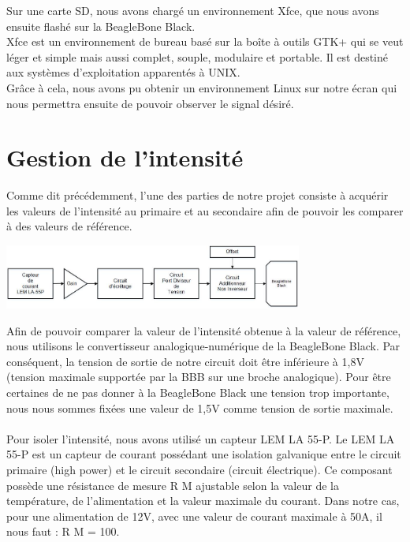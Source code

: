 \documentclass{report}
\begin{document}
Sur une carte SD, nous avons charg\'{e} un environnement Xfce, que nous avons ensuite flash\'{e}
sur la BeagleBone Black.\\
Xfce est un environnement de bureau bas\'{e} sur la boîte \`{a} outils GTK+ qui se veut l\'{e}ger et
simple mais aussi complet, souple, modulaire et portable. Il est destin\'{e} aux syst\`{e}mes
d'exploitation apparent\'{e}s \`{a} UNIX.\\
Gr\^{a}ce \`{a} cela, nous avons pu obtenir un environnement Linux sur notre \'{e}cran qui nous
permettra ensuite de pouvoir observer le signal d\'{e}sir\'{e}.

\section{Gestion de l'intensit\'{e}}

Comme dit pr\'{e}c\'{e}demment, l’une des parties de notre projet consiste \`{a} acqu\'{e}rir les valeurs
de l’intensit\'{e} au primaire et au secondaire afin de pouvoir les comparer \`{a} des valeurs de
r\'{e}f\'{e}rence.\\

\begin{center}
 \includegraphics[height=80]{./Schema/sch_bloc_amp.jpg}
\end{center}

Afin de pouvoir comparer la valeur de l’intensit\'{e} obtenue \`{a} la valeur de r\'{e}f\'{e}rence, nous
utilisons le convertisseur analogique-num\'{e}rique de la BeagleBone Black. Par cons\'{e}quent, la
tension de sortie de notre circuit doit \^{e}tre inf\'{e}rieure \`{a} 1,8V (tension maximale support\'{e}e par
la BBB sur une broche analogique). Pour \^{e}tre certaines de ne pas donner \`{a} la BeagleBone
Black une tension trop importante, nous nous sommes fix\'{e}es une valeur de 1,5V comme
tension de sortie maximale.\\ \\

Pour isoler l’intensit\'{e}, nous avons utilis\'{e} un capteur LEM LA 55-P.
Le LEM LA 55-P est un capteur de courant poss\'{e}dant une isolation galvanique entre le circuit
primaire (high power) et le circuit secondaire (circuit \'{e}lectrique).
Ce composant poss\`{e}de une r\'{e}sistance de mesure R M ajustable selon la valeur de la
temp\'{e}rature, de l’alimentation et la valeur maximale du courant. Dans notre cas, pour une
alimentation de \pm 12V, avec une valeur de courant maximale \`{a} \pm 50A, il nous faut :
R M = 100\Omega.
\end{document}
